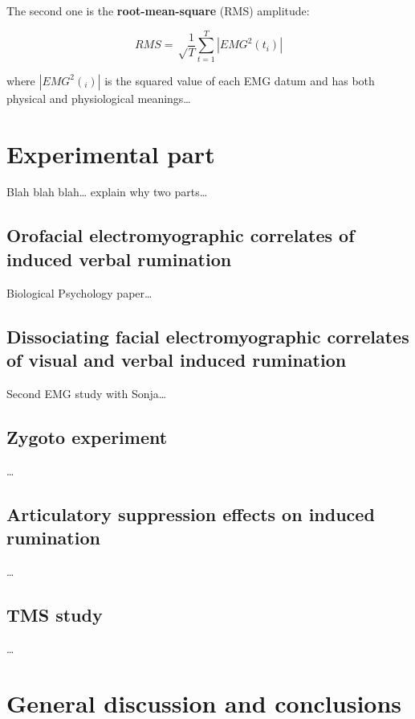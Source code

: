 \documentclass[12pt,]{book}
\begin{document}
The second one is the \textbf{root-mean-square} (RMS) amplitude:

\[RMS = \sqrt \frac{1}{T} \sum_{t=1}^{T} | EMG^{2}(t_{i}) |\]

where \(|EMG^{2}(_{i})|\) is the squared value of each EMG datum and has
both physical and physiological meanings\ldots{}

\part{Experimental part}\label{part-experimental-part}

Blah blah blah\ldots{} explain why two parts\ldots{}

\chapter{Orofacial electromyographic correlates of induced verbal
rumination}\label{orofacial-electromyographic-correlates-of-induced-verbal-rumination}

Biological Psychology paper\ldots{}

\chapter{Dissociating facial electromyographic correlates of visual and
verbal induced
rumination}\label{dissociating-facial-electromyographic-correlates-of-visual-and-verbal-induced-rumination}

Second EMG study with Sonja\ldots{}

\chapter{Zygoto experiment}\label{zygoto-experiment}

\ldots{}

\chapter{Articulatory suppression effects on induced
rumination}\label{articulatory-suppression-effects-on-induced-rumination}

\ldots{}

\chapter{TMS study}\label{tms-study}

\ldots{}

\part{General discussion and
conclusions}\label{part-general-discussion-and-conclusions}
\end{document}

